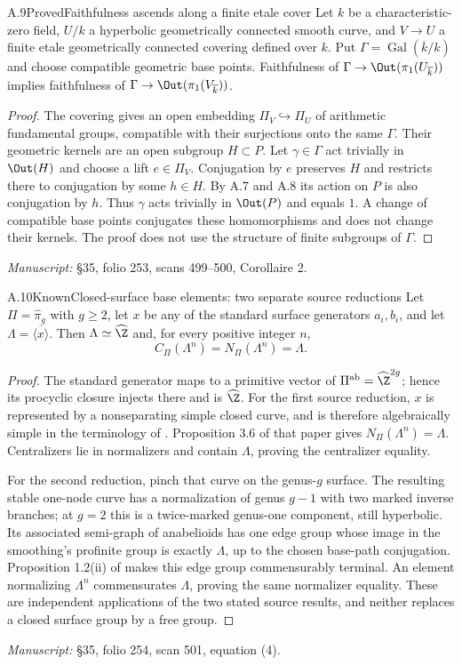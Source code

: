 \begin{claim}{A.9}{Proved}{Faithfulness ascends along a finite etale cover}
Let $k$ be a characteristic-zero field, $U/k$ a hyperbolic geometrically connected smooth curve, and $V\to U$ a finite etale geometrically connected covering defined over $k$. Put $\Gamma=\operatorname{Gal}(\overline k/k)$ and choose compatible geometric base points. Faithfulness of $\Gamma\to\Out(\pi_1(U_{\overline k}))$ implies faithfulness of $\Gamma\to\Out(\pi_1(V_{\overline k}))$.
\end{claim}
\begin{proof}
The covering gives an open embedding $\Pi_V\hookrightarrow\Pi_U$ of arithmetic fundamental groups, compatible with their surjections onto the same $\Gamma$. Their geometric kernels are an open subgroup $H\subset P$. Let $\gamma\in\Gamma$ act trivially in $\Out(H)$ and choose a lift $e\in\Pi_V$. Conjugation by $e$ preserves $H$ and restricts there to conjugation by some $h\in H$. By A.7 and A.8 its action on $P$ is also conjugation by $h$. Thus $\gamma$ acts trivially in $\Out(P)$ and equals $1$. A change of compatible base points conjugates these homomorphisms and does not change their kernels. The proof does not use the structure of finite subgroups of $\Gamma$.
\end{proof}
\noindent\emph{Manuscript:} \S35, folio 253, scans 499--500, Corollaire 2.

\begin{claim}{A.10}{Known}{Closed-surface base elements: two separate source reductions}
Let $\Pi=\widehat\pi_g$ with $g\ge2$, let $x$ be any of the standard surface generators $a_i,b_i$, and let $\Lambda=\overline{\langle x\rangle}$. Then $\Lambda\simeq\widehat\Z$ and, for every positive integer $n$,
\[
 C_\Pi(\Lambda^n)=N_\Pi(\Lambda^n)=\Lambda.
\]
\end{claim}
\begin{proof}
The standard generator maps to a primitive vector of $\Pi^{\mathrm{ab}}=\widehat\Z^{2g}$; hence its procyclic closure injects there and is $\widehat\Z$. For the first source reduction, $x$ is represented by a nonseparating simple closed curve, and is therefore algebraically simple in the terminology of \cite[Definition 1.3]{A_BoggiZalesskii2019}. Proposition 3.6 of that paper gives $N_\Pi(\Lambda^n)=\Lambda$. Centralizers lie in normalizers and contain $\Lambda$, proving the centralizer equality.

For the second reduction, pinch that curve on the genus-$g$ surface. The resulting stable one-node curve has a normalization of genus $g-1$ with two marked inverse branches; at $g=2$ this is a twice-marked genus-one component, still hyperbolic. Its associated semi-graph of anabelioids has one edge group whose image in the smoothing's profinite group is exactly $\Lambda$, up to the chosen base-path conjugation. Proposition 1.2(ii) of \cite{A_Mochizuki2007} makes this edge group commensurably terminal. An element normalizing $\Lambda^n$ commensurates $\Lambda$, proving the same normalizer equality. These are independent applications of the two stated source results, and neither replaces a closed surface group by a free group.
\end{proof}
\noindent\emph{Manuscript:} \S35, folio 254, scan 501, equation (4).

